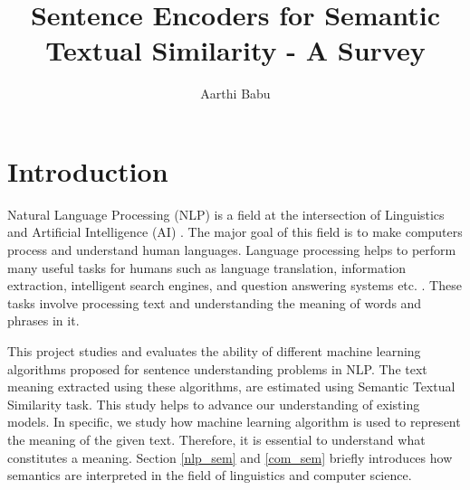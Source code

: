 \documentclass[12pt]{report} %
\title{Sentence Encoders for Semantic Textual Similarity - A Survey}
\author{Aarthi Babu}
\newcommand\blankpage{%
	\null
	\thispagestyle{empty}%
	\addtocounter{page}{-1}%
	\newpage}
\begin{document}
\maketitle
\cleardoublepage
\tableofcontents
\listoffigures
\listoftables
\afterpage{\blankpage}



\chapter{Introduction}
\label{introduction}

	Natural Language Processing (NLP) is a field at the intersection of Linguistics and Artificial Intelligence (AI) \citep{jurafsky2014speech}. The major goal of this field is to make computers process and understand human languages. Language processing helps to perform many useful tasks for humans such as language translation, information extraction, intelligent search engines, and question answering systems etc. \citep{jurafsky2014speech}. These tasks involve processing text and understanding the meaning of words and phrases in it. 
	
	This project studies and evaluates the ability of different machine learning algorithms proposed for sentence understanding problems in NLP. The text meaning extracted using these algorithms, are estimated using Semantic Textual Similarity task. This study helps to advance our understanding of existing models. In specific, we study how machine learning algorithm is used to represent the meaning of the given text. Therefore, it is essential to understand what constitutes a meaning. Section \ref{nlp_sem} and \ref{com_sem} briefly introduces how semantics are interpreted in the field of linguistics and computer science.
	
\end{document}
